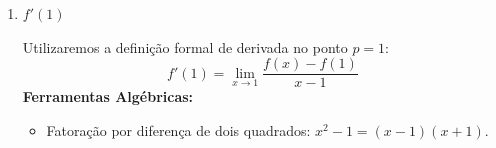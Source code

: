 \documentclass[12pt,a4paper]{article}
\newcommand{\qedsymbolmath}{\tag*{\textcolor{blue!70!black}{\rule{1.6ex}{1.6ex}}}}
\begin{document}
\begin{enumerate}
    \begin{recursosbox}[title=Recursos Utilizados]
    Utilizaremos a definição formal de derivada no ponto $p = 0$:
    \[
    f'(0) = \lim_{x \to 0} \frac{f(x) - f(0)}{x - 0}
    \]
    \end{recursosbox}

    Pela definição formal de derivada no ponto $p = 0$, temos:
    \begin{equation}
        f'(0) = \lim_{x \to 0} \frac{f(x) - f(0)}{x - 0} \label{eq:def_derivada_ponto0}
    \end{equation}

    Primeiro, manipulamos o quociente incremental para $x \neq 0$:
    \begin{equation}
        \frac{f(x) - f(0)}{x - 0} \label{eq:quociente_ponto0}
    \end{equation}

    Sendo $f(x) = x^2 + 1$, calculamos o valor da função em $p = 0$:
    \[
    f(0) = 0^2 + 1 = 1
    \]

    Substituindo $f(x)$ e $f(0)$ em \eqref{eq:quociente_ponto0}:
    \begin{align*}
        \frac{f(x) - f(0)}{x - 0} &= \frac{(x^2 + 1) - 1}{x} \\[0.25cm]
        &= \frac{x^2}{x} \\[0.25cm]
        &= x
    \end{align*}

    Daí, aplicando o limite em \eqref{eq:def_derivada_ponto0} quando $x \to 0$:
    \[
    f'(0) = \lim_{x \to 0} x = 0
    \]

    Portanto:
    \begin{equation*}
        f'(0) = 0 \qedsymbolmath
    \end{equation*}

    \item $f'(1)$
    \setcounter{equation}{0}

    \begin{recursosbox}[title=Recursos Utilizados]
    Utilizaremos a definição formal de derivada no ponto $p = 1$:
    \[
    f'(1) = \lim_{x \to 1} \frac{f(x) - f(1)}{x - 1}
    \]
    \textbf{Ferramentas Algébricas:}
    \begin{itemize}[noitemsep, topsep=2pt]
        \item Fatoração por diferença de dois quadrados: $x^2 - 1 = (x - 1)(x + 1)$.
    \end{itemize}
    \end{recursosbox}


\end{enumerate}
\end{document}
